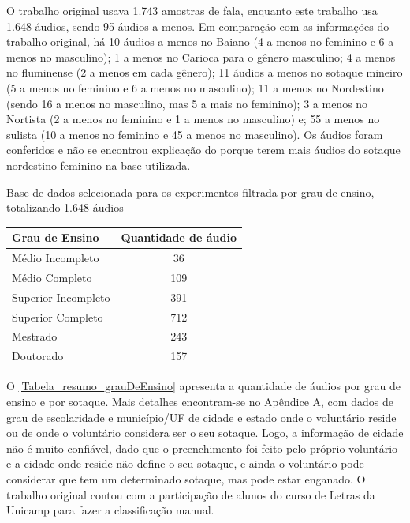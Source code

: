 O trabalho original usava 1.743 amostras de fala, enquanto este trabalho usa 1.648 áudios, sendo 95 áudios a menos. Em comparação com as informações do trabalho original, há 10 áudios a menos no Baiano (4 a menos no feminino e 6 a menos no masculino); 1 a menos no Carioca para o gênero masculino; 4 a menos no fluminense (2 a menos em cada gênero); 11 áudios a menos no sotaque mineiro (5 a menos no feminino e 6 a menos no masculino); 11 a menos no Nordestino (sendo 16 a menos no masculino, mas 5 a mais no feminino); 3 a menos no Nortista (2 a menos no feminino e 1 a menos no masculino) e; 55 a menos no sulista (10 a menos no feminino e 45 a menos no masculino). Os áudios foram conferidos e não se encontrou explicação do porque terem mais áudios do sotaque nordestino feminino na base utilizada. 


\begin{quadro}[h!]
\caption{Base de dados selecionada para os experimentos filtrada por grau de ensino, totalizando 1.648 áudios}
\label{Tabela_resumo_grauDeEnsino}
\centering
\begin{tabular}{|l|c|}
\hline
\textbf{Grau de Ensino} & \multicolumn{1}{l|}{\textbf{Quantidade de áudio}} \\ \hline
Médio Incompleto        & 36                                                \\ \hline
Médio Completo          & 109                                               \\ \hline
Superior Incompleto     & 391                                               \\ \hline
Superior Completo       & 712                                               \\ \hline
Mestrado                & 243                                               \\ \hline
Doutorado               & 157                                               \\ \hline
\end{tabular}
\end{quadro}



O \autoref{Tabela_resumo_grauDeEnsino} apresenta a quantidade de áudios por grau de ensino e por sotaque. Mais detalhes encontram-se no Apêndice A, com dados de grau de escolaridade e município/UF de cidade e estado onde o voluntário reside ou de onde o voluntário considera ser o seu sotaque. Logo, a informação de cidade não é muito confiável, dado que o preenchimento foi feito pelo próprio voluntário e a cidade onde reside não define o seu sotaque, e ainda o voluntário pode considerar que tem um determinado sotaque, mas pode estar enganado. O trabalho original contou com a participação de alunos do curso de Letras da Unicamp para fazer a classificação manual.



